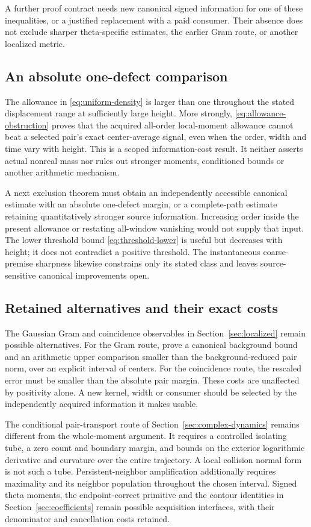 A further proof contract needs new canonical signed information for
one of these inequalities, or a justified replacement with a paid
consumer. Their absence does not exclude sharper theta-specific
estimates, the earlier Gram route, or another localized metric.

\subsection{An absolute one-defect comparison}
The allowance in \eqref{eq:uniform-density} is larger than one throughout
the stated displacement range at sufficiently large height. More
strongly, \eqref{eq:allowance-obstruction} proves that the acquired
all-order local-moment allowance cannot beat a selected pair's exact
center-average signal, even when the order, width and time vary with
height. This is a scoped information-cost result. It neither asserts
actual nonreal mass nor rules out stronger moments, conditioned bounds
or another arithmetic mechanism.

A next exclusion theorem must obtain an independently accessible
canonical estimate with an absolute one-defect margin, or a complete-path
estimate retaining quantitatively stronger source information. Increasing
order inside the present allowance or restating all-window vanishing
would not supply that input. The lower threshold bound
\eqref{eq:threshold-lower} is useful but decreases with height; it does
not contradict a positive threshold. The instantaneous coarse-premise
sharpness likewise constrains only its stated class and leaves
source-sensitive canonical improvements open.

\subsection{Retained alternatives and their exact costs}
The Gaussian Gram and coincidence observables in
Section~\ref{sec:localized} remain possible alternatives. For the Gram
route, prove a canonical background bound and an arithmetic upper
comparison smaller than the background-reduced pair norm, over an
explicit interval of centers. For the coincidence route, the rescaled
error must be smaller than the absolute pair margin. These costs are
unaffected by positivity alone. A new kernel, width or consumer should
be selected by the independently acquired information it makes usable.

The conditional pair-transport route of
Section~\ref{sec:complex-dynamics} remains different from the whole-moment
argument. It requires a controlled isolating tube, a zero count and
boundary margin, and bounds on the exterior logarithmic derivative and
curvature over the entire trajectory. A local collision normal form is
not such a tube. Persistent-neighbor amplification additionally requires
maximality and its neighbor population throughout the chosen interval.
Signed theta moments, the endpoint-correct primitive and the contour
identities in Section~\ref{sec:coefficients} remain possible acquisition
interfaces, with their denominator and cancellation costs retained.

